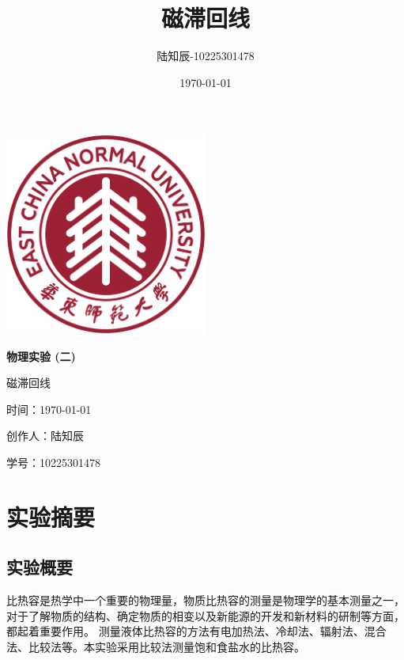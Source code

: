 \documentclass{ctexart}
\title{磁滞回线}
\author{陆知辰-10225301478}
\date{\today}
\begin{document}
\begin{titlepage}
  \centering
  \includegraphics[width=0.5\textwidth]{ecnu.png}
  
  \vspace*{\baselineskip}
  
  \Huge\textbf{物\quad 理\quad 实\quad 验 \quad (二)}
  \vspace*{0.3\baselineskip}
  
  \huge 磁滞回线
  
  \vspace*{2\baselineskip}
  
  \large 时间：\today
  
  \vspace*{\baselineskip}
  
  \large 创作人：陆知辰
  
  \vspace*{\baselineskip}
  
  \large 学号：10225301478
  
\end{titlepage}
\newpage
\tableofcontents
\newpage
\section{实验摘要}
  \subsection{实验概要}
  比热容是热学中一个重要的物理量，物质比热容的测量是物理学的基本测量之一，
  对于了解物质的结构、确定物质的相变以及新能源的开发和新材料的研制等方面，都起着重要作用。
  测量液体比热容的方法有电加热法、冷却法、辐射法、混合法、比较法等。本实验采用比较法测量饱和食盐水的比热容。
\end{document}
